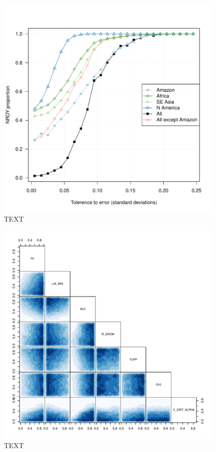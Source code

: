 \documentclass[esd, manuscript]{copernicus}
\begin{document}
\begin{figure}[t]
\includegraphics[width=12cm]{graphics/Prop_NROY_tolerance_unc.pdf}
\caption{TEXT}
\label{fig:Prop_NROY_tolerance_unc}
\end{figure}

\begin{figure}[t]
\includegraphics[width=12cm]{graphics/best_inputs_amazon.pdf}
\caption{TEXT}
\label{fig:best_inputs_amazon}
\end{figure}
\end{document}
